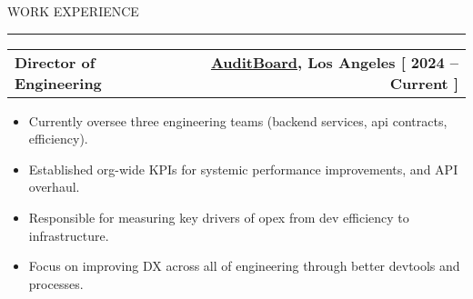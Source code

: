 \documentclass[12pt]{article}
\makeatletter
\newenvironment{justifycolumns}
{\begin{tabular*}{\textwidth}{@{\extracolsep{\fill}} lr@{}}}
{\end{tabular*}}
\newcommand{\row}[2]{#1 & #2 \\}
\newcommand{\rowheading}[2]{\row{\textbf{#1}}{\textbf{#2}}}
\newcommand{\range}[2]{#1 -- #2}
\newcommand{\blockseparation}{\vspace{0.13in}}
\newcommand{\heading}[1]{
	\vspace{0.05in}
	\uppercase{#1}
	\vspace{0.05in}
	\hrule
	\blockseparation
}
\newenvironment{tightbullets}
{\begin{itemize}}
{\end{itemize}}
\newenvironment{bullets}
{\begin{tightbullets}}
{\end{tightbullets} \blockseparation}
\makeatother
\begin{document}
\begin{flushleft}
\pagebreak

\heading{Work Experience}
\vspace{0.05in}

\hspace{0.2in}
\begin{justifycolumns}
	\hspace{0.1in}
	\rowheading{Director of Engineering}{\textnormal{\href{https://auditboard.com}{AuditBoard}, Los Angeles [ \range{2024}{Current} ]}}
\end{justifycolumns}
\begin{bullets}
	\item Currently oversee three engineering teams (backend services, api contracts, efficiency).
	\item Established org-wide KPIs for systemic performance improvements, and API overhaul.
	\item Responsible for measuring key drivers of opex from dev efficiency to infrastructure.
	\item Focus on improving DX across all of engineering through better devtools and processes.
\end{bullets}
\vspace{0.05in}


\end{flushleft}
\end{document}
